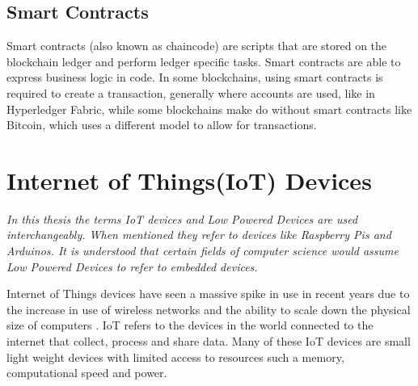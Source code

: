 \subsection{Smart Contracts}

Smart contracts (also known as chaincode) are scripts that are stored on the blockchain ledger and perform ledger specific tasks. Smart contracts are able to express business logic in code. In some blockchains, using smart contracts is required to create a transaction, generally where accounts are used, like in Hyperledger Fabric, while some blockchains make do without smart contracts like Bitcoin, which uses a different model to allow for transactions.\cite{SCIOT}






\section{Internet of Things(IoT) Devices}

\textit{In this thesis the terms IoT devices and Low Powered Devices are used interchangeably. When mentioned they refer to devices like Raspberry Pis and Arduinos. It is understood that certain fields of computer science would assume Low Powered Devices to refer to embedded devices.}

Internet of Things devices have seen a massive spike in use in recent years due to the increase in use of wireless networks and the ability to scale down the physical size of computers \cite{ManagingIOTbc}. IoT refers to the devices in the world connected to the internet that collect, process and share data. Many of these IoT devices are small light weight devices with limited access to resources such a memory, computational speed and power. 

